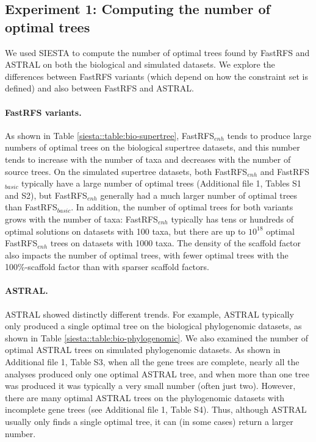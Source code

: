 \subsection{Experiment 1: Computing the number of optimal trees}
We used SIESTA to compute the number of optimal trees found by FastRFS and ASTRAL on both the biological and simulated datasets.
We explore the differences between FastRFS variants (which depend on how the constraint set is defined) and also between FastRFS and ASTRAL.

\paragraph{FastRFS variants. }
As shown in Table \ref{siesta::table:bio-supertree}, FastRFS$_{enh}$  tends to produce large numbers of optimal trees on the biological supertree datasets, and this number tends to increase with the number of taxa and decreases with the number of source trees.
On the simulated  supertree datasets, both FastRFS$_{enh}$ and FastRFS$_{basic}$ typically have a large number of optimal trees  (Additional file 1, Tables S1 and S2),  but FastRFS$_{enh}$  generally had a much larger number of optimal trees than FastRFS$_{basic}$.  
In addition, the number of optimal trees for both variants grows with the number of taxa: 
FastRFS$_{enh}$ typically has tens or hundreds of optimal solutions on datasets with 100 taxa, 
but there are up to  
$10^{18}$ optimal FastRFS$_{enh}$ trees on datasets with 1000 taxa.
The density of the scaffold factor also impacts the number of optimal trees, with fewer optimal trees with the 100\%-scaffold factor than with sparser scaffold factors.


\paragraph{ASTRAL. }
ASTRAL showed distinctly different trends. 
For example, ASTRAL typically only produced a single optimal tree on the biological phylogenomic datasets, as shown in Table \ref{siesta::table:bio-phylogenomic}.
We also examined the number of optimal ASTRAL trees on simulated phylogenomic datasets.
As shown in  Additional file 1, Table S3,  when all the gene trees are complete, nearly all the analyses produced only one optimal ASTRAL tree, and when more than one tree was produced it was typically a very small number (often just two).  
However, there are many optimal ASTRAL trees on the phylogenomic datasets with incomplete gene trees  (see Additional file 1, Table S4).
Thus, although ASTRAL usually only finds a single optimal tree, it can (in some cases) return a larger number.


